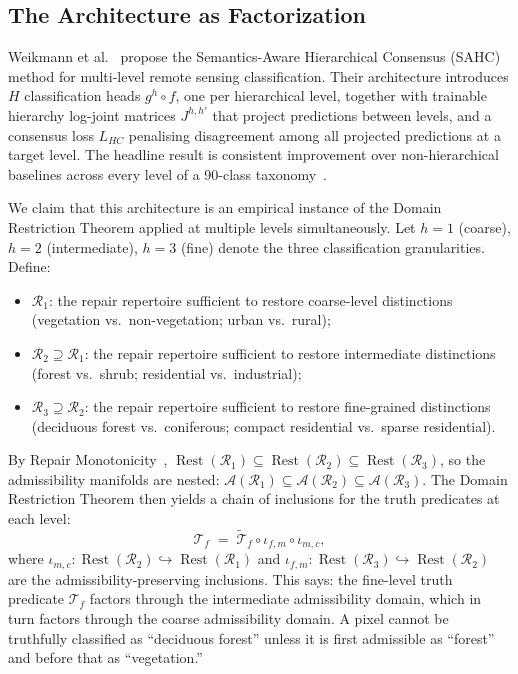 \documentclass[12pt, oneside]{article}
\theoremstyle{plain}
\theoremstyle{definition}
\theoremstyle{remark}
\DeclareMathOperator{\Rest}{Rest}
\newcommand{\iotamap}{\iota}        %
\begin{document}
\subsection{The Architecture as Factorization}

Weikmann et al.~\cite{Weikmann2026} propose the
Semantics-Aware Hierarchical Consensus (SAHC) method
for multi-level remote sensing classification.
Their architecture introduces $H$ classification heads
$g^h \circ f$, one per hierarchical level, together with
trainable hierarchy log-joint matrices $J^{h,h'}$ that project
predictions between levels, and a consensus loss $L_{HC}$
penalising disagreement among all projected predictions at
a target level.
The headline result is consistent improvement over
non-hierarchical baselines across every level of a
90-class taxonomy~\cite{Weikmann2026}.

We claim that this architecture is an empirical instance of
the Domain Restriction Theorem applied at multiple levels
simultaneously.
Let $h = 1$ (coarse), $h = 2$ (intermediate), $h = 3$ (fine)
denote the three classification granularities.
Define:
\begin{itemize}
  \item $\mathcal{R}_1$: the repair repertoire sufficient to
    restore coarse-level distinctions (vegetation vs.\
    non-vegetation; urban vs.\ rural);
  \item $\mathcal{R}_2 \supseteq \mathcal{R}_1$: the repair
    repertoire sufficient to restore intermediate distinctions
    (forest vs.\ shrub; residential vs.\ industrial);
  \item $\mathcal{R}_3 \supseteq \mathcal{R}_2$: the repair
    repertoire sufficient to restore fine-grained distinctions
    (deciduous forest vs.\ coniferous; compact residential
    vs.\ sparse residential).
\end{itemize}
By Repair Monotonicity~\cite{Flyxion2026a},
$\Rest(\mathcal{R}_1) \subseteq \Rest(\mathcal{R}_2) \subseteq
\Rest(\mathcal{R}_3)$,
so the admissibility manifolds are nested:
$\mathcal{A}(\mathcal{R}_1) \subseteq \mathcal{A}(\mathcal{R}_2)
\subseteq \mathcal{A}(\mathcal{R}_3)$.
The Domain Restriction Theorem then yields a chain of
inclusions for the truth predicates at each level:
\[
  \mathcal{T}_f
  \;=\;
  \widetilde{\mathcal{T}}_f
  \circ \iotamap_{f,m}
  \circ \iotamap_{m,c},
\]
where $\iotamap_{m,c}: \Rest(\mathcal{R}_2) \hookrightarrow
\Rest(\mathcal{R}_1)$ and $\iotamap_{f,m}: \Rest(\mathcal{R}_3)
\hookrightarrow \Rest(\mathcal{R}_2)$ are the admissibility-preserving
inclusions.
This says: the fine-level truth predicate $\mathcal{T}_f$
factors through the intermediate admissibility domain,
which in turn factors through the coarse admissibility domain.
A pixel cannot be truthfully classified as ``deciduous forest''
unless it is first admissible as ``forest'' and before that as
``vegetation.''
\end{document}
